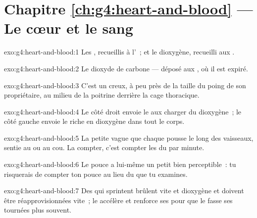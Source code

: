 \section*{Chapitre \ref{ch:g4:heart-and-blood} --- Le cœur et le sang}

\begin{solution}{exo:g4:heart-and-blood:1}
Les , recueillis à l'~; et le dioxygène,
recueilli aux .
\end{solution}

\begin{solution}{exo:g4:heart-and-blood:2}
Le dioxyde de carbone --- déposé aux , où il est expiré.
\end{solution}

\begin{solution}{exo:g4:heart-and-blood:3}
C'est un  creux, à peu près de la taille du poing de son
propriétaire, au milieu de la poitrine derrière la cage thoracique.
\end{solution}

\begin{solution}{exo:g4:heart-and-blood:4}
Le côté droit envoie le  aux  charger du dioxygène~; le
côté gauche envoie le  riche en dioxygène dans tout le corps.
\end{solution}

\begin{solution}{exo:g4:heart-and-blood:5}
La petite vague que chaque  pousse le long des vaisseaux,
sentie au  ou au cou. La compter, c'est compter les
 du  par minute.
\end{solution}

\begin{solution}{exo:g4:heart-and-blood:6}
Le pouce a lui-même un petit  bien perceptible~: tu risquerais
de compter ton pouce au lieu du  que tu examines.
\end{solution}

\begin{solution}{exo:g4:heart-and-blood:7}
Des  qui sprintent brûlent vite  et dioxygène et
doivent être réapprovisionnées vite~; le  accélère et renforce
ses  pour que le  fasse ses tournées plus souvent.
\end{solution}

